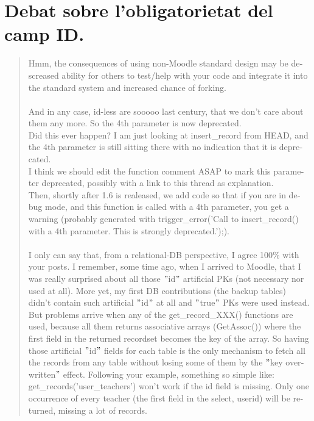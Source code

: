 \documentclass[a4paper]{report}  %
\begin{document}
\section{Debat sobre l'obligatorietat del camp ID.}\label{annexcampid}
\begin{otherlanguage}{english}
\begin{quote}
Hmm, the consequences of using non-Moodle standard design may be descreased ability for others to test/help with your code and integrate it into the standard system and increased chance of forking.
\     \ \\ \     \ \\
And in any case, id-less are sooooo last century, that we don't care about them any more. So the 4th parameter is now deprecated.\\
Did this ever happen? I am just looking at insert\_record from HEAD, and the 4th parameter is still sitting there with no indication that it is deprecated.\\
I think we should edit the function comment ASAP to mark this parameter deprecated, possibly with a link to this thread as explanation.\\
Then, shortly after 1.6 is realeased, we add code so that if you are in debug mode, and this function is called with a 4th parameter, you get a warning (probably generated with trigger\_error('Call to insert\_record() with a 4th parameter. This is strongly deprecated.');).
\     \ \\ \     \ \\
I only can say that, from a relational-DB perspective, I agree 100\% with your posts. I remember, some time ago, when I arrived to Moodle, that I was really surprised about all those $"$id$"$ artificial PKs (not necessary nor used at all). More yet, my first DB contributions (the backup tables) didn't contain such artificial $"$id$"$ at all and $"$true$"$ PKs were used instead.\\
But problems arrive when any of the get\_record\_XXX() functions are used, because all them returns associative arrays (GetAssoc()) where the first field in the returned recordset becomes the key of the array. So having those artificial $"$id$"$ fields for each table is the only mechanism to fetch all the records from any table without losing some of them by the $"$key overwritten$"$ effect. Following your example, something so simple like: get\_records('user\_teachers')
won't work if the id field is missing. Only one occurrence of every teacher (the first field in the select, userid) will be returned, missing a lot of records.\\

\end{quote}
\end{otherlanguage}
\end{document}
